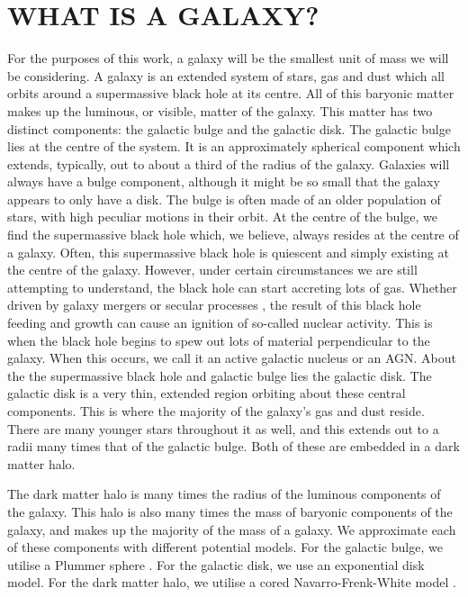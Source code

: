\section{WHAT IS A GALAXY?}
\noindent For the purposes of this work, a galaxy will be the smallest unit of mass we will be considering. A galaxy is an extended system of stars, gas and dust which all orbits around a supermassive black hole at its centre. All of this baryonic matter makes up the luminous, or visible, matter of the galaxy. This matter has two distinct components: the galactic bulge and the galactic disk. The galactic bulge lies at the centre of the system. It is an approximately spherical component which extends, typically, out to about a third of the radius of the galaxy. Galaxies will always have a bulge component, although it might be so small that the galaxy appears to only have a disk. The bulge is often made of an older population of stars, with high peculiar motions in their orbit. At the centre of the bulge, we find the supermassive black hole which, we believe, always resides at the centre of a galaxy. Often, this supermassive black hole is quiescent and simply existing at the centre of the galaxy. However, under certain circumstances we are still attempting to understand, the black hole can start accreting lots of gas. Whether driven by galaxy mergers \citep{} or secular processes \citep{}, the result of this black hole feeding and growth can cause an ignition of so-called nuclear activity. This is when the black hole begins to spew out lots of material perpendicular to the galaxy. When this occurs, we call it an active galactic nucleus or an AGN. About the the supermassive black hole and galactic bulge lies the galactic disk. The galactic disk is a very thin, extended region orbiting about these central components. This is where the majority of the galaxy's gas and dust reside. There are many younger stars throughout it as well, and this extends out to a radii many times that of the galactic bulge. Both of these are embedded in a dark matter halo.

The dark matter halo is many times the radius of the luminous components of the galaxy. This halo is also many times the mass of baryonic components of the galaxy, and makes up the majority of the mass of a galaxy. We approximate each of these components with different potential models. For the galactic bulge, we utilise a Plummer sphere \citep{1911MNRAS..71..460P}. For the galactic disk, we use an exponential disk model. For the dark matter halo, we utilise a cored Navarro-Frenk-White model \citep{1997ApJ...490..493N}.

